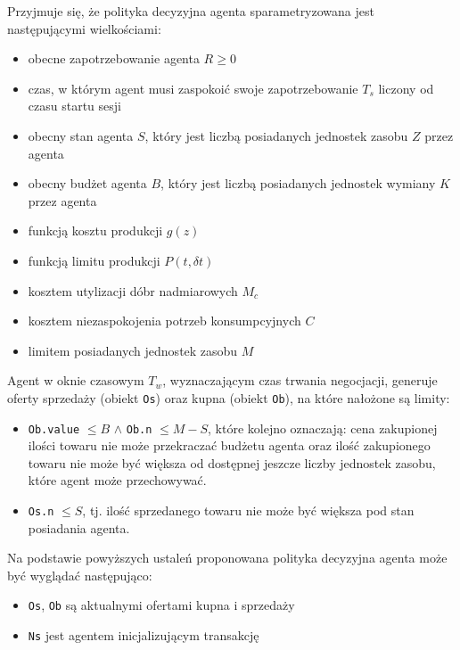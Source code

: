 \documentclass[]{article}
\providecommand{\tightlist}{%
  \setlength{\itemsep}{0pt}\setlength{\parskip}{0pt}}
\begin{document}
Przyjmuje się, że polityka decyzyjna agenta sparametryzowana jest
następującymi wielkościami:

\begin{itemize}
\tightlist
\item
  obecne zapotrzebowanie agenta \(R \geq 0\)
\item
  czas, w którym agent musi zaspokoić swoje zapotrzebowanie \(T_s\)
  liczony od czasu startu sesji
\item
  obecny stan agenta \(S\), który jest liczbą posiadanych jednostek
  zasobu \(Z\) przez agenta
\item
  obecny budżet agenta \(B\), który jest liczbą posiadanych jednostek
  wymiany \(K\) przez agenta
\item
  funkcją kosztu produkcji \(g(z)\)
\item
  funkcją limitu produkcji \(P(t, \delta t)\)
\item
  kosztem utylizacji dóbr nadmiarowych \(M_c\)
\item
  kosztem niezaspokojenia potrzeb konsumpcyjnych \(C\)
\item
  limitem posiadanych jednostek zasobu \(M\)
\end{itemize}

Agent w oknie czasowym \(T_w\), wyznaczającym czas trwania negocjacji,
generuje oferty sprzedaży (obiekt \texttt{Os}) oraz kupna (obiekt
\texttt{Ob}), na które nałożone są limity:

\begin{itemize}
\tightlist
\item
  \texttt{Ob.value} \(\leq B\) \(\land\) \texttt{Ob.n} \(\leq M - S\),
  które kolejno oznaczają: cena zakupionej ilości towaru nie może
  przekraczać budżetu agenta oraz ilość zakupionego towaru nie może być
  większa od dostępnej jeszcze liczby jednostek zasobu, które agent może
  przechowywać.\\
\item
  \texttt{Os.n} \(\leq S\), tj. ilość sprzedanego towaru nie może być
  większa pod stan posiadania agenta.
\end{itemize}

Na podstawie powyższych ustaleń proponowana polityka decyzyjna agenta
może być wyglądać następująco:

\begin{itemize}
\tightlist
\item
  \texttt{O\textquotesingle{}s}, \texttt{O\textquotesingle{}b} są
  aktualnymi ofertami kupna i sprzedaży
\item
  \texttt{Ns} jest agentem inicjalizującym transakcję
\end{itemize}
\end{document}
